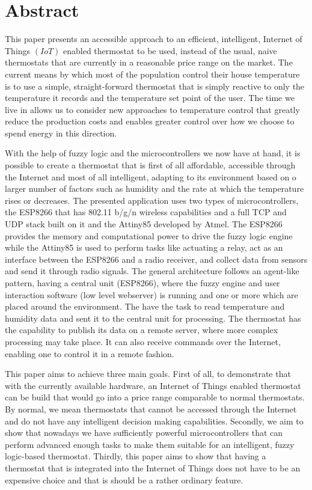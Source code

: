 \chapter*{Abstract}
\thispagestyle{empty}
\addtocounter{page}{-1}

\scriptsize

\qquad This paper presents an accessible approach to an efficient, intelligent, Internet of Things $(IoT)$ enabled
thermostat to be used, instead of the usual, naive thermostats that are currently in a reasonable price range
on the market. The current means by which most of the population control their house temperature is to use a
simple, straight-forward thermostat that is simply reactive to only the temperature it records and the
temperature set point of the user. The time we live in allows us to consider new approaches to temperature
control that greatly reduce the production costs and enables greater control over how we choose to spend energy
in this direction.

\qquad With the help of fuzzy logic and the microcontrollers we now have at hand, it is possible
to create a thermostat that is first of all affordable, accessible through the Internet and most of all
intelligent, adapting to its environment based on o larger number of factors such as humidity and the rate at
which the temperature rises or decreases. The presented application uses two types of microcontrollers, the ESP8266
that has 802.11 b/g/n wireless capabilities and a full TCP and UDP stack built on it and the Attiny85
developed by Atmel. The ESP8266 provides the memory and computational power to drive the fuzzy logic engine
while the Attiny85 is used to perform tasks like actuating a relay, act as an interface between the ESP8266
and a radio receiver, and collect data from sensors and send it through radio signals.
The general architecture follows an agent-like pattern, having a central unit (ESP8266), where the fuzzy engine and user
interaction software (low level webserver) is running and one or more  which are placed around the environment.
The  have the task to read temperature and humidity data and sent it to the central unit for
processing. The thermostat has the capability to publish its data on a remote server, where more complex
processing may take place. It can also receive commands over the Internet, enabling one to control it in a
remote fashion.


\qquad This paper aims to achieve three main goals. First of all, to demonstrate that with the currently
available hardware, an Internet of Things enabled thermostat can be build that would go into a price range
comparable to normal thermostats. By normal, we mean thermostats that cannot be accessed through the Internet
and do not have any intelligent decision making capabilities. Secondly, we aim to show that nowadays we have
sufficiently powerful microcontrollers that can perform advanced enough tasks to make them suitable
for an intelligent, fuzzy logic-based thermostat. Thirdly, this paper aims to show that having a thermostat
that is integrated into the Internet of Things does not have to be an expensive choice and that is should be
a rather ordinary feature.

